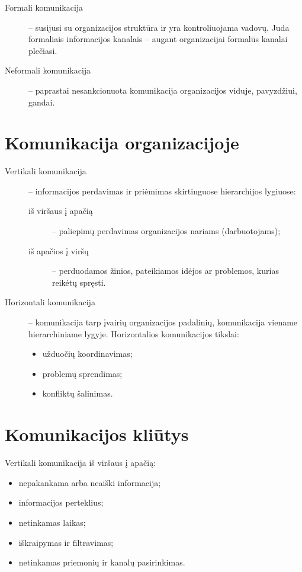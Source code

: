 \begin{description}
  \item[Formali komunikacija] – susijusi su organizacijos struktūra ir
    yra kontroliuojama vadovų. Juda formaliais informacijos kanalais
    – augant organizacijai formalūs kanalai plečiasi.
  \item[Neformali komunikacija] – paprastai nesankcionuota komunikacija
    organizacijos viduje, pavyzdžiui, gandai.
\end{description}

\section{Komunikacija organizacijoje}

\begin{description}
  \item[Vertikali komunikacija] – informacijos perdavimas ir priėmimas
    skirtinguose hierarchijos lygiuose:
    \begin{description}
      \item[iš viršaus į apačią] – paliepimų perdavimas organizacijos
        nariams (darbuotojams);
      \item[iš apačios į viršų] – perduodamos žinios, pateikiamos idėjos
        ar problemos, kurias reikėtų spręsti.
    \end{description}
  \item[Horizontali komunikacija] – komunikacija tarp įvairių organizacijos
    padalinių, komunikacija viename hierarchiniame lygyje. Horizontalios
    komunikacijos tikslai:
    \begin{itemize}
      \item užduočių koordinavimas;
      \item problemų sprendimas;
      \item konfliktų šalinimas.
    \end{itemize}
\end{description}

\section{Komunikacijos kliūtys}

Vertikali komunikacija iš viršaus į apačią:
\begin{itemize}
  \item nepakankama arba neaiški informacija;
  \item informacijos perteklius;
  \item netinkamas laikas;
  \item iškraipymas ir filtravimas;
  \item netinkamas priemonių ir kanalų pasirinkimas.
\end{itemize}

